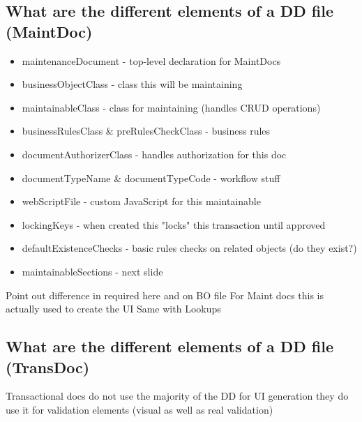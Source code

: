 \begin{ifhtml}
\begin{s5slide}
        \section{What are the different elements of a DD file (MaintDoc)}
            \begin{itemize}
                \item maintenanceDocument - top-level declaration for MaintDocs
                \item businessObjectClass - class this will be maintaining
                \item maintainableClass - class for maintaining (handles CRUD operations)
                \item businessRulesClass & preRulesCheckClass - business rules
                \item documentAuthorizerClass - handles authorization for this doc
                \item documentTypeName & documentTypeCode - workflow stuff
                \item webScriptFile - custom JavaScript for this maintainable
                \item lockingKeys - when created this "locks" this transaction until approved
                \item defaultExistenceChecks - basic rules checks on related objects (do they exist?)
                \item maintainableSections - next slide
            \end{itemize}
            \begin{s5notes}
                Point out difference in required here and on BO file
                For Maint docs this is actually used to create the UI
                Same with Lookups
            \end{s5notes}
            
    \end{s5slide}
    \begin{s5slide}
        \section{What are the different elements of a DD file (TransDoc)}
            \begin{s5notes}
                Transactional docs do not use the majority of the DD for UI generation they do use it for validation elements (visual as well as real validation)
            \end{s5notes}
    \end{s5slide}
    \begin{s5slide}

\end{s5slide}
\end{ifhtml}
